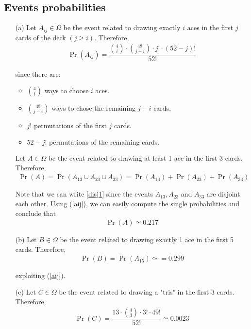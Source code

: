\subsection{Events probabilities}
\begin{itemize}
	\item[(a)] Let $A_{ij} \in \Omega$ be the event related to drawing exactly $i$ aces in the first $j$ cards of the deck $(j \geq i)$. Therefore,
	\begin{align}
		\Pr(A_{ij}) = \dfrac{\binom{4}{i} \cdot \binom{48}{j-i} \cdot j! \cdot (52-j)!}{52!} \label{aij}
	\end{align}
	
	since there are:
	\begin{itemize}
		\item $\binom{4}{i}$ ways to choose $i$ aces.
		\item $\binom{48}{j-i}$ ways to chose the remaining $j-i$ cards.
		\item $j!$ permutations of the first $j$ cards.
		\item $52-j!$ permutations of the remaining cards.
	\end{itemize}
	
	Let $A \in \Omega$ be the event related to drawing at least 1 ace in the first 3 cards. Therefore,
	\begin{align}
		\Pr(A) = \Pr(A_{13} \cup A_{23} \cup A_{33}) = \Pr(A_{13}) + \Pr(A_{23}) + \Pr(A_{33}) \label{disj1}
	\end{align}
	
	Note that we can write \ref{disj1} since the events $A_{13}, A_{23}$ and $A_{33}$ are disjoint each other. Using (\ref{aij}), we can easily compute the single probabilities and conclude that
	\begin{align*}
		\Pr(A) \simeq 0.217
	\end{align*}
	
	\item[(b)] Let $B \in \Omega$ be the event related to drawing exactly 1 ace in the first 5 cards. Therefore,
	\begin{align*}
		\Pr(B) = \Pr(A_{15}) \simeq= 0.299
	\end{align*}
	
	exploiting (\ref{aij}).
	
	\item[(c)] Let $C \in \Omega$ be the event related to drawing a "tris" in the first 3 cards. Therefore,
	\begin{align*}
		\Pr(C) = \dfrac{13 \cdot \binom{4}{3} \cdot 3! \cdot 49!}{52!} \simeq 0.0023
	\end{align*}
	

\end{itemize}
